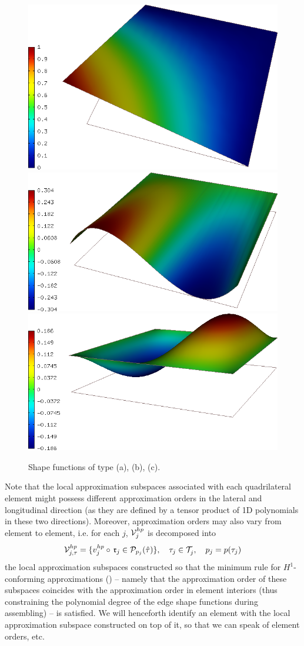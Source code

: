 \begin{figure}[!htb]
  \centering
  \includegraphics[width=.45\textwidth]{vtx}\hspace{.05\textwidth}
  \includegraphics[width=.45\textwidth]{face}\\[1em]
  \includegraphics[width=.45\textwidth]{bubble}
  \caption{Shape functions of type (a), (b), (c).}
 	\label{fig:bazep}
\end{figure}

Note that the local approximation subspaces associated with each quadrilateral element might possess different
approximation orders in the lateral and longitudinal direction (as they are defined by a tensor product of 1D
polynomials in these two directions).
Moreover, approximation orders may also vary from element to element, i.e. for each $j$, $\mathcal{V}^{hp}_j$ is decomposed into
\begin{equation*}
	\mathcal{V}^{hp}_{j,\tau} = \{v^{hp}_j \circ\, \mathfrak{r}_j \in
	\mathcal{P}_{p_j}(\hat{\tau})
	\},\quad \tau_j\in\mathcal{T}^{}_{j},\quad p_j = p(\tau_j)
\end{equation*}
the local approximation subspaces constructed so that the minimum rule for \mbox{$H^1$-conforming} approximations
(\cite[\S3.5.5]{Hermes-book1}) -- namely that the approximation order of these subspaces coincides with the
approximation order in element interiors (thus constraining the polynomial degree of the edge shape functions during
assembling) -- is satisfied. We will henceforth identify an element with the local approximation subspace
constructed on top of it, so that we can speak of element orders, etc.

